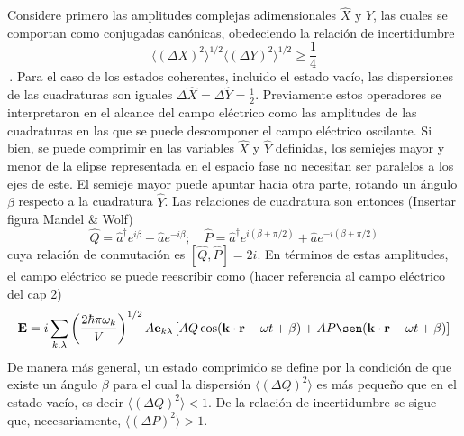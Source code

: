 Considere primero las amplitudes complejas adimensionales $\hat{X}$ y $\hat{Y}$, las cuales se comportan como conjugadas canónicas, obedeciendo la relación de incertidumbre
\begin{equation*}
  \langle (\Delta X)^2 \rangle ^{1/2} \langle (\Delta Y)^2 \rangle ^{1/2} \geq \frac{1}{4}
\end{equation*}\,.
Para el caso de los estados coherentes, incluido el estado vacío, las dispersiones de las cuadraturas son iguales $\Delta \hat{X} = \Delta \hat{Y} = \frac{1}{2}$. Previamente estos operadores se interpretaron en el alcance del campo eléctrico como las amplitudes de las cuadraturas en las que se puede descomponer el campo eléctrico oscilante. Si bien, se puede comprimir en las variables $\hat{X}$ y $\hat{Y}$ definidas, los semiejes mayor y menor de la elipse representada en el espacio fase no necesitan ser paralelos a los ejes de este. El semieje mayor puede apuntar hacia otra parte, rotando un ángulo $\beta$ respecto a la cuadratura $\hat{Y}$. Las relaciones de cuadratura son entonces (Insertar figura Mandel \& Wolf)
\begin{equation*}
  \hat{Q} = \hat{a}^{\dagger} e^{i\beta} + \hat{a} e^{-i\beta}; \quad \hat{P} = \hat{a}^{\dagger} e^{i(\beta + \pi/2)} + \hat{a} e^{-i(\beta + \pi/2)}
\end{equation*}
cuya relación de conmutación es $[\hat{Q}, \hat{P}] = 2i$. En términos de estas amplitudes, el campo eléctrico se puede reescribir como (hacer referencia al campo eléctrico del cap 2)
\begin{equation*}
  \mathbf{E} = i \sum_{k,\lambda} \left( \frac{2\hbar \pi \omega_k}{V} \right)^{1/2} \hat{\mathbf{e}}_{k\lambda} \left[ \hat{Q}\cos(\mathbf{k}\cdot\mathbf{r} - \omega t + \beta) + \hat{P}\sen(\mathbf{k}\cdot\mathbf{r} - \omega t + \beta) \right]
\end{equation*}
De manera más general, un estado comprimido se define por la condición de que existe un ángulo $\beta$ para el cual la dispersión $\langle (\Delta Q)^2 \rangle$ es más pequeño que en el estado vacío, es decir $\langle (\Delta Q)^2 \rangle < 1$. De la relación de incertidumbre se sigue que, necesariamente, $\langle (\Delta P)^2 \rangle > 1$.

